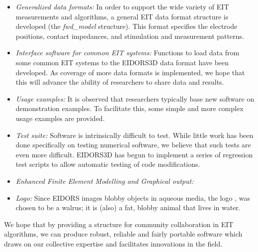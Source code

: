 \documentclass[12pt]{iopart}
\begin{document}
\begin{itemize}
  \item {\em Generalized data formats:}
In order to support the wide
variety of EIT measurements and algorithms, a general EIT data format
structure is developed (the {\em fwd\_model} structure).
This format specifies the electrode positions, contact impedances,
and stimulation and measurement patterns.

  \item {\em Interface software for common EIT systems:}
Functions
to load data from some common EIT systems to the EIDORS3D data
format have been developed.
As coverage of more data formats is implemented, 
we hope that this will advance the ability of researchers
to share data and results.

  \item {\em Usage examples:}
It is observed that researchers typically base new software on
demonstration examples. To facilitate this, some simple and more
complex usage examples are provided.

  \item {\em Test suite:}
Software is intrinsically difficult to test. While little work
has been done specifically on testing numerical software, we
believe that such tests are even more difficult.
EIDORS3D has begun to implement a series of regression test
scripts to allow automatic testing of code modifications.

  \item {\em Enhanced Finite Element Modelling and Graphical output:}

  \item {\em Logo:}
Since EIDORS images blobby objects in aqueous media,
the logo \label{fig:logo}, was chosen to be a walrus; it is (also)
a fat, blobby animal that lives in water.

%
%
\begin{figure}[th]
\end{figure}

\end{itemize}
We hope that by providing a structure for community collaboration
in EIT algorithms, we can produce robust,
reliable and fairly portable software which draws on our collective
expertise and facilitates innovations in the field.
\end{document}

